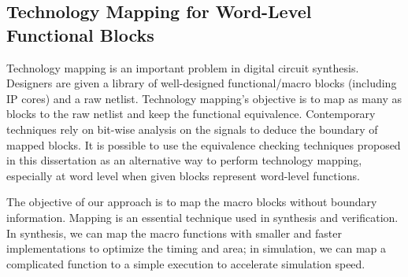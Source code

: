 \begin{figure}[tbp]
\end{figure}

% 

\subsection{Technology Mapping for Word-Level Functional Blocks}
Technology mapping is an important problem in digital circuit synthesis.
Designers are given a library of well-designed functional/macro blocks (including IP cores) and a raw netlist.
Technology mapping's objective is to map as many as blocks to the raw netlist and 
keep the functional equivalence. Contemporary techniques rely on bit-wise 
analysis on the signals to deduce the boundary of mapped blocks.
It is possible to use the equivalence checking techniques proposed in this dissertation 
as an alternative way to perform technology mapping, especially at word level when 
given blocks represent word-level functions.

The objective of our approach is to map the macro blocks without boundary information.
Mapping is an essential technique used in synthesis and verification. In synthesis, we can map the 
macro functions with smaller and faster implementations to optimize the timing and area; in simulation,
we can map a complicated function to a simple execution to accelerate simulation speed.

